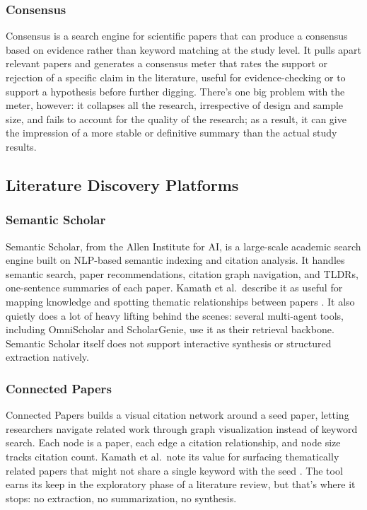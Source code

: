 \documentclass[sn-basic,Numbered]{sn-jnl}
\begin{document}
\subsubsection{Consensus} Consensus is a search engine for scientific papers that can produce a consensus based on evidence rather than keyword matching at the study level. It pulls apart relevant papers and generates a consensus meter that rates the support or rejection of a specific claim in the literature, useful for evidence-checking or to support a hypothesis before further digging. There's one big problem with the meter, however: it collapses all the research, irrespective of design and sample size, and fails to account for the quality of the research; as a result, it can give the impression of a more stable or definitive summary than the actual study results.

\subsection{Literature Discovery Platforms}

\subsubsection{Semantic Scholar} Semantic Scholar, from the Allen Institute for AI, is a large-scale academic search engine built on NLP-based semantic indexing and citation analysis. It handles semantic search, paper recommendations, citation graph navigation, and TLDRs, one-sentence summaries of each paper. Kamath et al.\ describe it as useful for mapping knowledge and spotting thematic relationships between papers \cite{kamath2025academic}. It also quietly does a lot of heavy lifting behind the scenes: several multi-agent tools, including OmniScholar and ScholarGenie, use it as their retrieval backbone. Semantic Scholar itself does not support interactive synthesis or structured extraction natively.

\subsubsection{Connected Papers} Connected Papers builds a visual citation network around a seed paper, letting researchers navigate related work through graph visualization instead of keyword search. Each node is a paper, each edge a citation relationship, and node size tracks citation count. Kamath et al.\ note its value for surfacing thematically related papers that might not share a single keyword with the seed \cite{kamath2025academic}. The tool earns its keep in the exploratory phase of a literature review, but that's where it stops: no extraction, no summarization, no synthesis.
\end{document}
